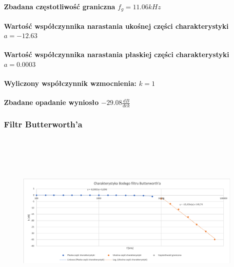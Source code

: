 \documentclass[a4paper,12pt]{article}
\begin{document}
\begin{justify}
\paragraph{Zbadana częstotliwość graniczna $f_{g} = 11.06kHz$}

\paragraph{Wartość współczynnika narastania ukośnej części charakterystyki $a = -12.63$}
\paragraph{Wartość współczynnika narastania płaskiej części charakterystyki $a = 0.0003$}

\paragraph{Wyliczony współczynnik wzmocnienia: $k = 1$}

\paragraph{Zbadane opadanie wyniosło $-29.08 \frac{dB}{dek}$}

\subsubsection{Filtr Butterworth'a}

\begin{figure}[h]
\centering
\includegraphics[width=15cm, height=9cm]{4_wykr_butterworth}
\end{figure}


\end{justify}
\end{document}
